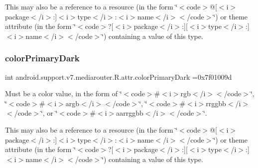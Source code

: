 This may also be a reference to a resource (in the form \char`\"{}$<$code$>$@\mbox{[}$<$i$>$package$<$/i$>$\+:\mbox{]}$<$i$>$type$<$/i$>$\+:$<$i$>$name$<$/i$>$$<$/code$>$\char`\"{}) or theme attribute (in the form \char`\"{}$<$code$>$?\mbox{[}$<$i$>$package$<$/i$>$\+:\mbox{]}\mbox{[}$<$i$>$type$<$/i$>$\+:\mbox{]}$<$i$>$name$<$/i$>$$<$/code$>$\char`\"{}) containing a value of this type. \mbox{\label{classandroid_1_1support_1_1v7_1_1mediarouter_1_1R_1_1attr_a92d196fe27bb6eef459e41535228b2b7}} 
\subsubsection{\texorpdfstring{color\+Primary\+Dark}{colorPrimaryDark}}
{\footnotesize\ttfamily int android.\+support.\+v7.\+mediarouter.\+R.\+attr.\+color\+Primary\+Dark =0x7f01009d\hspace{0.3cm}{\ttfamily [static]}}

Must be a color value, in the form of \char`\"{}$<$code$>$\#$<$i$>$rgb$<$/i$>$$<$/code$>$\char`\"{}, \char`\"{}$<$code$>$\#$<$i$>$argb$<$/i$>$$<$/code$>$\char`\"{}, \char`\"{}$<$code$>$\#$<$i$>$rrggbb$<$/i$>$$<$/code$>$\char`\"{}, or \char`\"{}$<$code$>$\#$<$i$>$aarrggbb$<$/i$>$$<$/code$>$\char`\"{}. 

This may also be a reference to a resource (in the form \char`\"{}$<$code$>$@\mbox{[}$<$i$>$package$<$/i$>$\+:\mbox{]}$<$i$>$type$<$/i$>$\+:$<$i$>$name$<$/i$>$$<$/code$>$\char`\"{}) or theme attribute (in the form \char`\"{}$<$code$>$?\mbox{[}$<$i$>$package$<$/i$>$\+:\mbox{]}\mbox{[}$<$i$>$type$<$/i$>$\+:\mbox{]}$<$i$>$name$<$/i$>$$<$/code$>$\char`\"{}) containing a value of this type. \mbox{\label{classandroid_1_1support_1_1v7_1_1mediarouter_1_1R_1_1attr_a4ba590583f4d6afa70e3b4d78c92e2bc}} 

